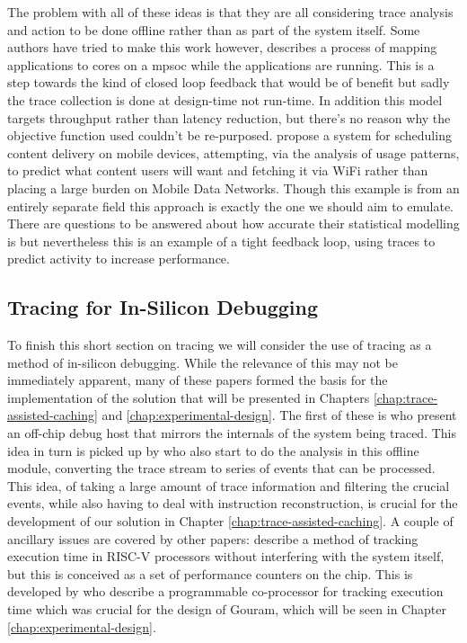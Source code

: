 The problem with all of these ideas is that they are all considering trace analysis and action to be done offline rather than as part of the system itself. Some authors have tried to make this work however, \citet{singhResourceThroughputAware2016} describes a process of mapping applications to cores on a \gls{mpsoc} while the applications are running. This is a step towards the kind of closed loop feedback that would be of benefit but sadly the trace collection is done at design-time not run-time. In addition this model targets throughput rather than latency reduction, but there's no reason why the objective function used couldn't be re-purposed. \citet{shoukryProactiveSchedulingContent2014} propose a system for scheduling content delivery on mobile devices, attempting, via the analysis of usage patterns, to predict what content users will want and fetching it via WiFi rather than placing a large burden on Mobile Data Networks. Though this example is from an entirely separate field this approach is exactly the one we should aim to emulate. There are questions to be answered about how accurate their statistical modelling is but nevertheless this is an example of a tight feedback loop, using traces to predict activity to increase performance. 

\subsection{Tracing for In-Silicon Debugging}

To finish this short section on tracing we will consider the use of tracing as a method of in-silicon debugging. While the relevance of this may not be immediately apparent, many of these papers formed the basis for the implementation of the solution that will be presented in Chapters \ref{chap:trace-assisted-caching} and \ref{chap:experimental-design}. The first of these is \citet{uzelacHardwareBasedLoadValue2013} who present an off-chip debug host that mirrors the internals of the system being traced. This idea in turn is picked up by \citet{deckerOnlineAnalysisDebug2018} who also start to do the analysis in this offline module, converting the trace stream to series of events that can be processed. This idea, of taking a large amount of trace information and filtering the crucial events, while also having to deal with instruction reconstruction, is crucial for the development of our solution in Chapter \ref{chap:trace-assisted-caching}. A couple of ancillary issues are covered by other papers: \citet{scheipelSystemAwarePerformanceMonitoring2017} describe a method of tracking execution time in RISC-V processors without interfering with the system itself, but this is conceived as a set of performance counters on the chip. This is developed by \citet{delshadtehraniNileProgrammableMonitoring2018} who describe a programmable co-processor for tracking execution time which was crucial for the design of Gouram, which will be seen in Chapter \ref{chap:experimental-design}. 

